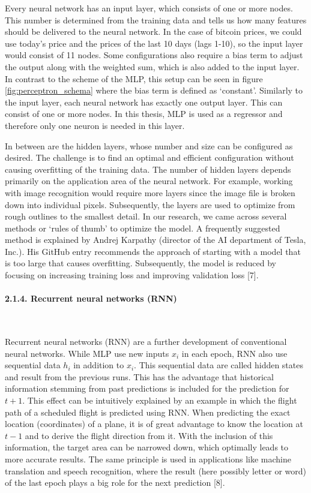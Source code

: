 \documentclass[
]{article}
\begin{document}
Every neural network has an input layer, which consists of one or more
nodes. This number is determined from the training data and tells us how
many features should be delivered to the neural network. In the case of
bitcoin prices, we could use today's price and the prices of the last 10
days (lags 1-10), so the input layer would consist of 11 nodes. Some
configurations also require a bias term to adjust the output along with
the weighted sum, which is also added to the input layer. In contrast to
the scheme of the MLP, this setup can be seen in figure
\ref{fig:perceptron_schema} where the bias term is defined as
`constant'. Similarly to the input layer, each neural network has
exactly one output layer. This can consist of one or more nodes. In this
thesis, MLP is used as a regressor and therefore only one neuron is
needed in this layer.

In between are the hidden layers, whose number and size can be
configured as desired. The challenge is to find an optimal and efficient
configuration without causing overfitting of the training data. The
number of hidden layers depends primarily on the application area of the
neural network. For example, working with image recognition would
require more layers since the image file is broken down into individual
pixels. Subsequently, the layers are used to optimize from rough
outlines to the smallest detail. In our research, we came across several
methods or `rules of thumb' to optimize the model. A frequently
suggested method is explained by Andrej Karpathy (director of the AI
department of Tesla, Inc.). His GitHub entry recommends the approach of
starting with a model that is too large that causes overfitting.
Subsequently, the model is reduced by focusing on increasing training
loss and improving validation loss {[}7{]}.

\hypertarget{RNN}{%
\paragraph{2.1.4. Recurrent neural networks (RNN)}\label{RNN}}

~

Recurrent neural networks (RNN) are a further development of
conventional neural networks. While MLP use new inputs \(x_i\) in each
epoch, RNN also use sequential data \(h_i\) in addition to \(x_i\). This
sequential data are called hidden states and result from the previous
runs. This has the advantage that historical information stemming from
past predictions is included for the prediction for \(t+1\). This effect
can be intuitively explained by an example in which the flight path of a
scheduled flight is predicted using RNN. When predicting the exact
location (coordinates) of a plane, it is of great advantage to know the
location at \(t-1\) and to derive the flight direction from it. With the
inclusion of this information, the target area can be narrowed down,
which optimally leads to more accurate results. The same principle is
used in applications like machine translation and speech recognition,
where the result (here possibly letter or word) of the last epoch plays
a big role for the next prediction {[}8{]}.
\end{document}
